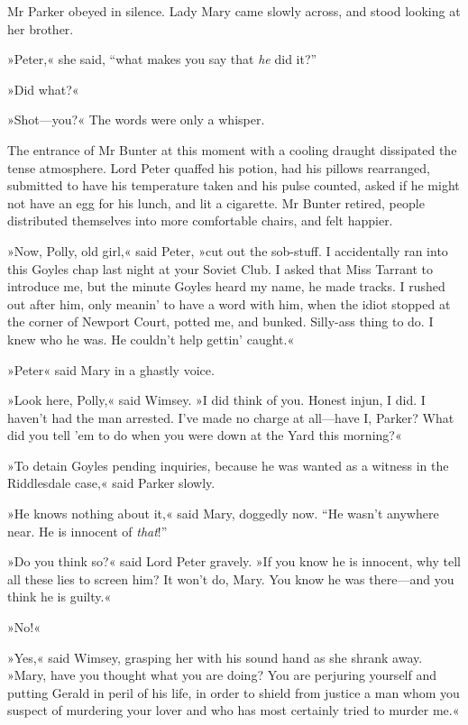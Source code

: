 Mr Parker obeyed in silence. Lady Mary came slowly across, and stood looking at her brother.

»Peter,« she said, \enquote{what makes you say that \textit{he} did it?}

»Did what?«

»Shot\allowbreak---\allowbreak you?« The words were only a whisper.

The entrance of Mr Bunter at this moment with a cooling draught dissipated the tense atmosphere. Lord Peter quaffed his potion, had his pillows rearranged, submitted to have his temperature taken and his pulse counted, asked if he might not have an egg for his lunch, and lit a cigarette. Mr Bunter retired, people distributed themselves into more comfortable chairs, and felt happier.

»Now, Polly, old girl,« said Peter, »cut out the sob-stuff. I accidentally ran into this Goyles chap last night at your Soviet Club.  I asked that Miss Tarrant to introduce me, but the minute Goyles heard my name, he made tracks. I rushed out after him, only meanin' to have a word with him, when the idiot stopped at the corner of Newport Court, potted me, and bunked. Silly-ass thing to do. I knew who he was. He couldn't help gettin' caught.«

»Peter\longdash« said Mary in a ghastly voice.

»Look here, Polly,« said Wimsey. »I did think of you. Honest injun, I did. I haven't had the man arrested. I've made no charge at all\allowbreak---\allowbreak have I, Parker? What did you tell 'em to do when you were down at the Yard this morning?«

»To detain Goyles pending inquiries, because he was wanted as a witness in the Riddlesdale case,« said Parker slowly.

»He knows nothing about it,« said Mary, doggedly now. \enquote{He wasn't anywhere near. He is innocent of \textit{that}!}

»Do you think so?« said Lord Peter gravely. »If you know he is innocent, why tell all these lies to screen him? It won't do, Mary. You know he was there\allowbreak---\allowbreak and you think he is guilty.«

»No!«

»Yes,« said Wimsey, grasping her with his sound hand as she shrank away. »Mary, have you thought what you are doing? You are perjuring yourself and putting Gerald in peril of his life, in order to shield from justice a man whom you suspect of murdering your lover and who has most certainly tried to murder me.«

